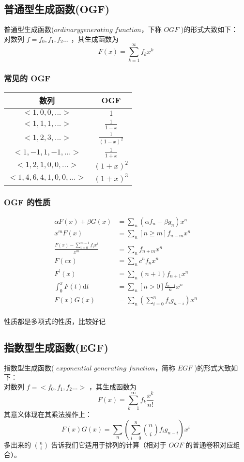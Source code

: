 	\subsection{普通型生成函数(OGF)}
	普通型生成函数($ordinary$​ $generating$ $function$，下称 $OGF$ )的形式大致如下：\\
	对数列 $f=f_0,f_1,f_2... $ ，其生成函数为
	$$
	F(x)=\sum_{k=1}^{\infty}f_kx^k
	$$
	\subsubsection{常见的 OGF}
	\begin{center}
		\renewcommand\arraystretch{2.3}
		\renewcommand\tabcolsep{40.0pt}
		\begin{tabular}{|c|c|}
			\hline
			数列&OGF\\
			\hline
			$<1,0,0,...>$&$\displaystyle 1$\\
			\hline
			$<1,1,1,...>$&$\displaystyle \frac{1}{1-x}$\\
			\hline
			$<1,2,3,...>$&$\displaystyle \frac{1}{(1-x)^2}$\\
			\hline
			$<1,-1,1,-1,...>$&$\displaystyle \frac{1}{1+x}$\\
			\hline
			$<1,2,1,0,0,...>$&$\displaystyle (1+x)^2$\\
			\hline
			$<1,4,6,4,1,0,0,...>$&$\displaystyle (1+x)^3$\\
			\hline
		\end{tabular}	
	\end{center}
	\subsubsection{ OGF 的性质}
	$$
	\begin{aligned}
	\alpha F(x)+\beta G(x)&=\sum_n(\alpha f_n+\beta g_n)x^n\\
	x^mF(x)&=\sum_n[n\geq m]f_{n-m}x^n\\
	\frac{F(x)-\sum_{i=0}^{m-1}f_ix^i}{x^m}&=\sum_nf_{n+m}x^n\\
	F(cx)&=\sum_nc^nf_nx^n\\
	F^\prime(x)&=\sum_n(n+1)f_{n+1}x^n\\
	\int_0^xF(t)\mathrm{d}t&=\sum_n[n>0]\frac{f_{n-1}}nx^n\\
	F(x)G(x)&=\sum_n\left(\sum_{i=0}^nf_ig_{n-i}\right)x^n
	\end{aligned}
	$$\\
	性质都是多项式的性质，比较好记
	\newpage
	\subsection{指数型生成函数(EGF)}
	指数型生成函数( $exponential$ $generating$ $function$，简称 $EGF$ )的形式大致如下：\\
	对数列 $f=<f_0,f_1,f_2...>$ ，其生成函数为
	$$
	F(x)=\sum_{k=1}^{\infty}f_k\frac{x^k}{n!}
	$$
	其意义体现在其乘法操作上： 
	$$
	F(x)G(x)=\sum_n\left(\sum_{i=0}^n\binom nif_ig_{n-i}\right)x^i
	$$
	多出来的 $\binom{n}{i}$ 告诉我们它适用于排列的计算（相对于 $OGF$ 的普通卷积对应组合）。
